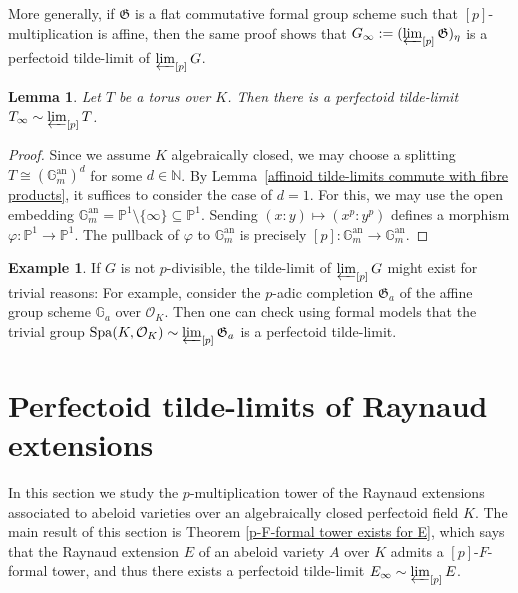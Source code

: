 \documentclass[10pt,oneside]{amsart}
\newtheorem{lemma}[theorem]{Lemma}
\theoremstyle{definition}
\newtheorem{remark}[theorem]{Remark}
\newtheorem{example}[theorem]{Example}
\newcommand{\an}{\mathrm{an}}
\newcommand{\N}{\mathbb{N}}
\begin{document}
More generally, if $\mathfrak G$ is a flat commutative formal group scheme such that $[p]$-multiplication is affine, then the same proof shows that $G_\infty := (\varprojlim_{[p]}\mathfrak G)_\eta$ is a perfectoid tilde-limit of $\varprojlim_{[p]} G$. 
\begin{lemma}
	Let $T$ be a torus over $K$. Then there is a perfectoid tilde-limit $T_\infty\sim \varprojlim_{[p]} T$.
\end{lemma}
\begin{proof}
Since we assume $K$ algebraically closed, we may choose a splitting $T\cong (\mathbb{G}_m^{\an})^d$ for some $d\in \N$. By Lemma~\ref{affinoid tilde-limits commute with fibre products}, it suffices to consider the case of $d=1$. For this, we may use the open embedding $\mathbb G_m^{\an}= \mathbb P^1\setminus\{\infty\}\subseteq \mathbb P^1$. Sending $(x:y)\mapsto (x^p:y^p)$ defines a morphism $\varphi:\mathbb P^1\to \mathbb P^1$. The pullback of $\varphi$ to $\mathbb G_m^{\an}$ is precisely $[p]:\mathbb G_m^{\an}\to \mathbb G_m^{\an}$.
\end{proof}

			
	\begin{example}
		If $G$ is not $p$-divisible, the tilde-limit of $\varprojlim_{[p]}G$ might exist for trivial reasons: For example, consider the $p$-adic completion  $\mathfrak G_a$  of the affine group scheme $\mathbb G_a$ over $\mathcal O_K$. Then one can check using formal models that the trivial group $\operatorname{Spa}(K,\mathcal O_K)\sim \varprojlim_{[p]}\mathfrak G_a$ is a perfectoid tilde-limit.
	\end{example}
	
 
 
	
 
	

	\section{Perfectoid tilde-limits of Raynaud extensions}\label{Raynaud extensions as principal bundles of formal and rigid spaces}
	In this section we study the $p$-multiplication tower of the Raynaud extensions associated to abeloid varieties over an algebraically closed perfectoid field $K$. The main result of this section is Theorem \ref{p-F-formal tower exists for E}, which says that the Raynaud extension $E$ of an abeloid variety $A$ over $K$ admits a $[p]$-$F$-formal tower, and thus there exists a perfectoid tilde-limit $E_\infty \sim \varprojlim_{[p]} E$.  
	
\end{document}
